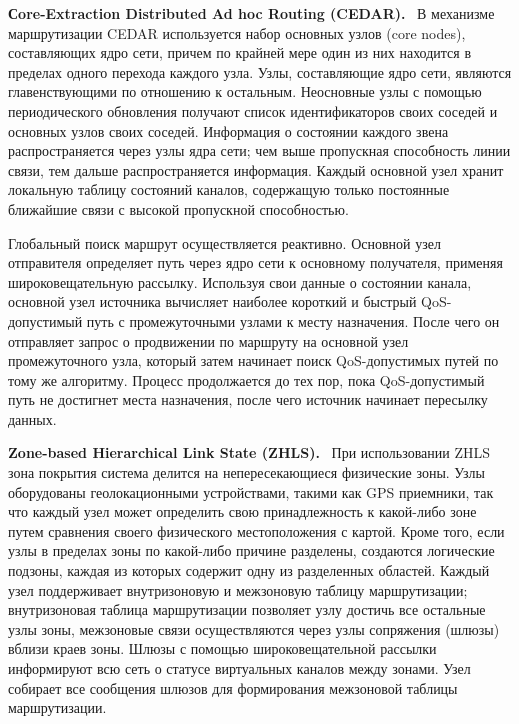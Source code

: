 \documentclass[14pt,a4paper,titlepage]{extarticle}
\renewcommand{\paragraph}[1]{\textbf{#1.}~}
\begin{document}
\paragraph{Сore-Extraction Distributed Ad hoc Routing (CEDAR)}
В механизме маршрутизации CEDAR используется набор основных узлов (core nodes), составляющих ядро сети, причем по крайней мере один из них находится в пределах одного перехода каждого узла. Узлы, составляющие ядро сети, являются главенствующими по отношению к остальным. Неосновные узлы с помощью периодического обновления получают список идентификаторов своих соседей и основных узлов своих соседей. Информация о состоянии каждого звена распространяется через узлы ядра сети; чем выше пропускная способность линии связи, тем дальше распространяется информация. Каждый основной узел хранит локальную таблицу состояний каналов, содержащую только постоянные ближайшие связи с высокой пропускной способностью.
 
Глобальный поиск маршрут осуществляется реактивно. Основной узел отправителя определяет путь через ядро сети к основному получателя, применяя широковещательную рассылку. Используя свои данные о состоянии канала, основной узел источника вычисляет наиболее короткий и быстрый QoS-допустимый путь с промежуточными узлами к месту назначения. После чего он отправляет запрос о продвижении по маршруту на основной узел промежуточного узла, который затем начинает поиск QoS-допустимых путей по тому же алгоритму. Процесс продолжается до тех пор, пока QoS-допустимый путь не достигнет места назначения, после чего источник начинает пересылку данных.

\paragraph{Zone-based Hierarchical Link State (ZHLS)}
При использовании ZHLS зона покрытия система делится на непересекающиеся физические зоны. Узлы оборудованы геолокационными устройствами, такими как GPS приемники, так что каждый узел может определить свою принадлежность к какой-либо зоне путем сравнения своего физического местоположения с картой. Кроме того, если узлы в пределах зоны по какой-либо причине разделены, создаются логические подзоны, каждая из которых содержит одну из разделенных областей. Каждый узел поддерживает внутризоновую и межзоновую таблицу маршрутизации; внутризоновая таблица маршрутизации позволяет узлу достичь все остальные узлы зоны, межзоновые связи осуществляются через узлы сопряжения (шлюзы) вблизи краев зоны. Шлюзы с помощью широковещательной рассылки информируют всю сеть о статусе виртуальных каналов между зонами. Узел собирает все сообщения шлюзов для формирования межзоновой таблицы маршрутизации. 
\end{document}

